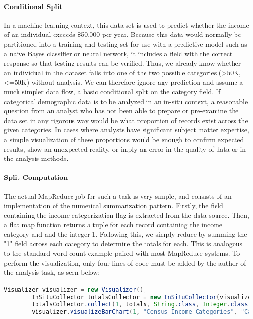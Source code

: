 \paragraph{Conditional Split}
In a machine learning context, this data set is used to predict whether the income of an individual exceeds \$50,000 per year. Because this data would normally be partitioned into a training and testing set for use with a predictive model such as a naive Bayes classifier or neural network, it includes a field with the correct response so that testing results can be verified. Thus, we already know whether an individual in the dataset falls into one of the two possible categories (>50K, <=50K) without analysis. We can therefore ignore any prediction and assume a much simpler data flow, a basic conditional split on the category field. If categorical demographic data is to be analyzed in an in-situ context, a reasonable question from an analyst who has not been able to prepare or pre-examine the data set in any rigorous way would be what proportion of records exist across the given categories. In cases where analysts have significant subject matter expertise, a simple visualization of these proportions would be enough to confirm expected results, show an unexpected reality, or imply an error in the quality of data or in the analysis methods.

\paragraph{Split Computation}
The actual MapReduce job for such a task is very simple, and consists of an implementation of the numerical summarization pattern. Firstly, the field containing the income categorization flag is extracted from the data source. Then, a flat map function returns a tuple for each record containing the income category and and the integer 1. Following this, we simply reduce by summing the "1" field across each category to determine the totals for each. This is analogous to the standard word count example paired with most MapReduce systems. To perform the visualization, only four lines of code must be added by the author of the analysis task, as seen below:

\paragraph{}
\begin{lstlisting}[language=Java,showspaces=false,showstringspaces=false,breaklines=true, breakatwhitespace=true]
        Visualizer visualizer = new Visualizer();
        InSituCollector totalsCollector = new InSituCollector(visualizer);
        totalsCollector.collect(1, totals, String.class, Integer.class);
        visualizer.visualizeBarChart(1, "Census Income Categories", "Category", "Count");
\end{lstlisting}

